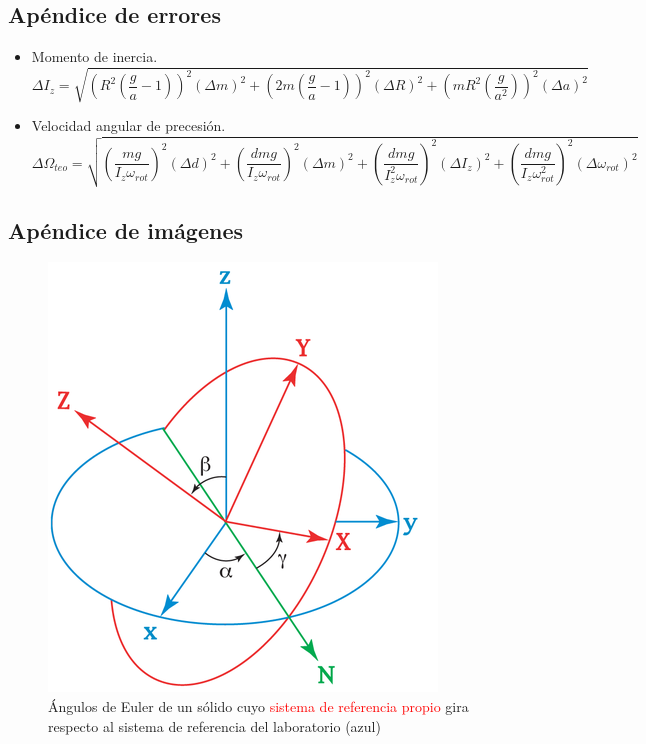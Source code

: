\documentclass[a4paper]{article}
\begin{document}
\subsection*{Apéndice de errores}
\begin{itemize}
\item Momento de inercia.
\begin{equation}
\Delta I_z=\sqrt{\left(R^2\left(\frac{g}{a}-1\right)\right)^2\left(\Delta m\right)^2+\left(2m\left(\frac{g}{a}-1\right)\right)^2 \left(\Delta R\right)^2+\left(mR^2\left(\frac{g}{a^2}\right)\right)^2\left(\Delta a\right)^2}
\end{equation}
\item Velocidad angular de precesión.
\begin{equation}
\Delta\Omega_{teo}=\sqrt{\left(\frac{mg}{I_z\omega_{rot}}\right)^2\left(\Delta d\right)^2+\left(\frac{dmg}{I_z\omega_{rot}}\right)^2\left(\Delta m\right)^2+\left(\frac{dmg}{I^2_z\omega_{rot}}\right)^2 \left(\Delta I_z\right)^2+\left(\frac{dmg}{I_z \omega^2_{rot}}\right)^2\left(\Delta \omega_{rot}\right)^2}
\end{equation}

\end{itemize}
\subsection*{Apéndice de imágenes}
\begin{figure}[H]
\begin{center}
\includegraphics[width=8 cm]{euler.png}
\caption{Ángulos de Euler de un sólido cuyo \textcolor{red}{sistema de referencia propio} gira respecto al \textcolor{blue!70!cyan!85!white}{sistema de referencia del laboratorio} (azul)}
\end{center}
\label{fig:Euler}
\end{figure}
\nocite{*}


\end{document}
